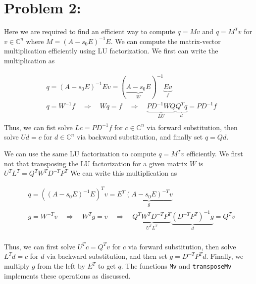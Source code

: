 \section*{Problem 2:}
Here we are required to find an efficient way to compute $q = Mv$ and $q = M^{T}v$ for $v \in \mathbb{C}^{n}$ where $M = (A - s_{0}E)^{-1}E$. We can compute the matrix-vector multiplication efficiently using LU factorization. We first can write the multiplication as

\begin{align*}
& q = (A-s_{0}E)^{-1}Ev = (\underbrace{A-s_{0}E}_{W})^{-1}\underbrace{Ev}_{f} \\
& q = W^{-1} f \quad \Rightarrow \quad Wq = f \quad \Rightarrow \quad \underbrace{PD^{-1}WQ}_{LU}\underbrace{Q^{T}q}_{d} = PD^{-1}f \\
\end{align*}
Thus, we can fist solve $Lc = PD^{-1}f$ for $c \in \mathbb{C}^{n}$ via forward substitution, then solve $Ud = c$ for $d \in \mathbb{C}^{n}$ via backward substitution, and finally set $q = Qd$. 

We can use the same LU factorization to compute $q = M^{T}v$ efficiently. We first not that transposing the LU factorization for a given matrix $W$ is $U^{T}L^{T} = Q^{T}W^{T}D^{-T}P^{T}$
 We can write this multiplication as 

\begin{align*}
& q = ((A-s_{0}E)^{-1}E)^{T}v = E^{T}\underbrace{(A-s_{0}E)^{-T}v}_{g}\\
& g = W^{-T} v \quad \Rightarrow \quad W^{T}g = v \quad \Rightarrow \quad \underbrace{Q^{T}W^{T}D^{-T}P^{T}}_{U^{T}L^{T}}\underbrace{(D^{-T}P^{T})^{-1}g}_{d}=Q^{T}v\\
\end{align*}

Thus, we can first solve $U^{T}c = Q^{T}v$ for $c$ via forward substitution, then solve $L^{T}d = c$ for $d$ via backward substitution, and then set $g = D^{-T}P^{T}d$. Finally, we multiply $g$ from the left by $E^{T}$ to get $q$. The functions \texttt{Mv} and \texttt{transposeMv} implements these operations as discussed. 

